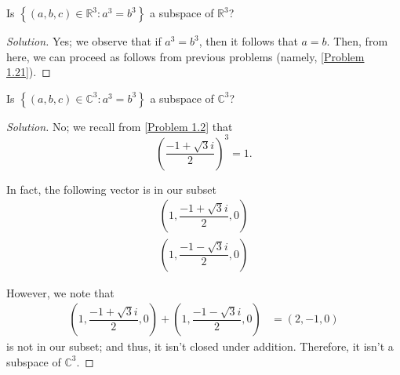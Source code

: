 \documentclass[openany]{book}
\newenvironment{solution}{\begin{proof}[Solution]}{\end{proof}}
\newcommand{\CC}{\mathbb{C}}
\newcommand{\RR}{\mathbb{R}}
\begin{document}
	\begin{hw}
		Is $\left\{  (a,b,c) \in \RR^{3} : a^{3} = b^{3} \right\}$ a subspace of $\RR^{3}$?
	\end{hw}
	\begin{solution}
		Yes; we observe that if $a^{3} = b^{3}$, then it follows that $a = b$. Then, from here, we can proceed as follows from previous problems (namely, \ref{Problem 1.21}).
	\end{solution}

	\begin{hw}
		Is $\left\{  (a,b,c) \in \CC^{3} : a^{3} = b^{3} \right\}$ a subspace of $\CC^{3}$?
	\end{hw}
	\begin{solution}
		No; we recall from \ref{Problem 1.2} that
		\begin{equation*}
			\left( \dfrac{-1 + \sqrt 3 i}{2} \right)^{3} = 1.
		\end{equation*}
	
		In fact, the following vector is in our subset 
		\begin{align*}
			\left( 1,  \dfrac{-1 + \sqrt 3 i}{2}, 0 \right) \\
			\left( 1, \dfrac{-1 - \sqrt 3 i}{2} , 0 \right)
		\end{align*}
	
		However, we note that
		\begin{align*}
				\left( 1, \dfrac{-1 + \sqrt 3 i}{2} , 0 \right) + \left( 1,  \dfrac{-1 - \sqrt 3 i}{2}, 0 \right) &= (2, -1, 0)
		\end{align*}
		is not in our subset; and thus, it isn't closed under addition. Therefore, it isn't a subspace of $\CC^{3}$.
	\end{solution}
\end{document}
